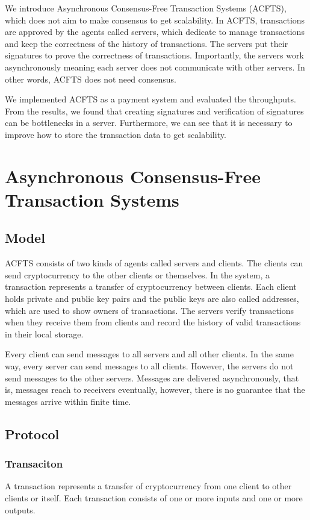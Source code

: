 \documentclass[a4paper, oneside]{discothesis}
\begin{document}
We introduce Asynchronous Consensus-Free Transaction Systems (ACFTS),
which does not aim to make consensus to get scalability.
In ACFTS, transactions are approved by the agents called servers,
which dedicate to manage transactions and keep the correctness of the history of transactions.
The servers put their signatures to prove the correctness of transactions.
Importantly, the servers work asynchronously meaning each server
does not communicate with other servers.
In other words, ACFTS does not need consensus.

We implemented ACFTS as a payment system and evaluated the throughputs.
From the results, we found that creating signatures and verification of signatures
can be bottlenecks in a server.
Furthermore, we can see that it is necessary to improve how to store the transaction data
to get scalability.

\chapter{Asynchronous Consensus-Free Transaction Systems}

\section{Model}
ACFTS consists of two kinds of agents called servers and clients.
The clients can send cryptocurrency to the other clients or themselves.
In the system, a transaction represents a transfer of cryptocurrency between clients.
Each client holds private and public key pairs
and the public keys are also called addresses, which are used to show owners of transactions.
The servers verify transactions when they receive them from clients
and record the history of valid transactions in their local storage.

Every client can send messages to all servers and all other clients.
In the same way, every server can send messages to all clients.
However, the servers do not send messages to the other servers.
Messages are delivered asynchronously, that is, messages reach to receivers eventually,
however, there is no guarantee that the messages arrive within finite time.


\section{Protocol}

\subsection{Transaciton}
A transaction represents a transfer of cryptocurrency from one client to other clients or itself.
Each transaction consists of one or more inputs and one or more outputs.
\end{document}
